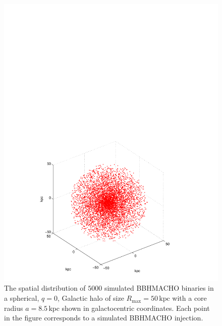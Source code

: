 \begin{figure}[p]
\begin{center}
\includegraphics[width=\linewidth]{figures/macho/spherical_cartesian}
\end{center}
\caption{\label{f:spherical_cartesian}%
The spatial distribution of $5000$ simulated BBHMACHO binaries in a spherical,
$q=0$, Galactic halo of size $R_\mathrm{max} = 50\,\mathrm{kpc}$ with a core
radius $a = 8.5\,\mathrm{kpc}$ shown in galactocentric coordinates. Each point
in the figure corresponds to a simulated BBHMACHO injection.
}
\end{figure}

